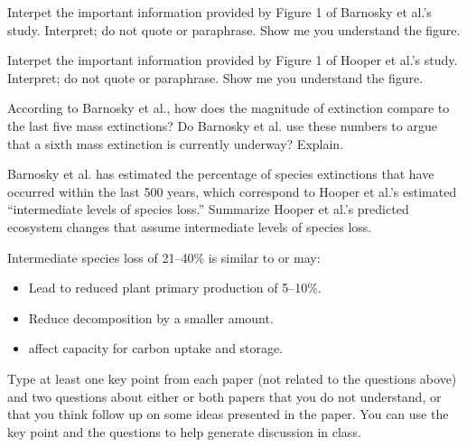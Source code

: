 \documentclass[11pt, addpoints]{exam}
\begin{document}
\begin{questions}

\question[5]
 Interpet the important information provided by Figure 1 of Barnosky et 
  al.'s study. Interpret; do not quote or paraphrase. Show me you
  understand the figure.

\question[5]
Interpet the important information provided by Figure 1 of Hooper et
  al.'s study. Interpret; do not quote or paraphrase. Show me you
  understand the figure.
  

\question[5]
According to Barnosky et al., how does the magnitude of extinction compare to the last five mass extinctions? Do
  Barnosky et al. use these numbers to argue that a sixth mass
  extinction is currently underway? Explain.


\question[10]
Barnosky et al. has estimated the percentage of species extinctions
  that have occurred within the last 500 years, which correspond to
  Hooper et al.'s estimated ``intermediate levels of species loss.''
  Summarize Hooper et al.'s predicted ecosystem changes that assume
  intermediate levels of species loss.

\ifprintanswers\begin{solution}
Intermediate species loss of 21--40\% is similar to or may:

\begin{itemize}
	\item Lead to reduced plant primary production of 5--10\%.

	\item Reduce decomposition by a smaller amount.

	\item affect capacity for carbon uptake and storage.
\end{itemize}
\end{solution}
\else
\fi

\question[5]
Type at least one key point from each paper (not related to the
  questions above) and two questions about either or both papers that
  you do not understand, or that you think follow up on some ideas
  presented in the paper. You can use the key point and the questions to
  help generate discussion in class. 


\end{questions}
\end{document}
